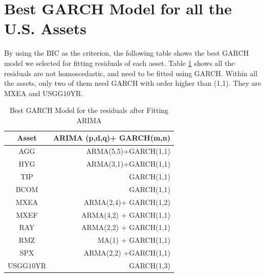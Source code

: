 \documentclass[12pt]{article}
\begin{document}
\section{Best GARCH Model for all the U.S. Assets}
By using the BIC as the criterion, the following table shows the best GARCH model we selected for fitting residuals of each asset. Table \ref{table:BestGarch} shows all the residuals are not homoscedastic, and need to be fitted using GARCH. Within all the assets, only two of them need GARCH with order higher than (1,1). They are MXEA and USGG10YR.
\begin{table}[!h]
\caption{Best GARCH Model for the residuals after Fitting ARIMA}
\centering 
\begin{tabular}{ | c || r | } 
 \hline
Asset & ARIMA (p,d,q)+ GARCH(m,n) \\
  \hline \hline
AGG & ARMA(5,5)+GARCH(1,1) \\ 
HYG & ARMA(3,1)+GARCH(1,1) \\ 
TIP &  GARCH(1,1)\\ 
BCOM & GARCH(1,1)\\ 
MXEA & ARMA(2,4)+ GARCH(1,2) \\ 
MXEF & ARMA(4,2) + GARCH(1,1)\\ 
RAY &  ARMA(2,2) + GARCH(1,1)\\ 
RMZ & MA(1) + GARCH(1,1) \\ 
SPX & ARMA(2,2) +GARCH(1,1)\\ 
USGG10YR & GARCH(1,3) \\
 \hline
\end{tabular}
\label{table:BestGarch}
\end{table}
\end{document}
